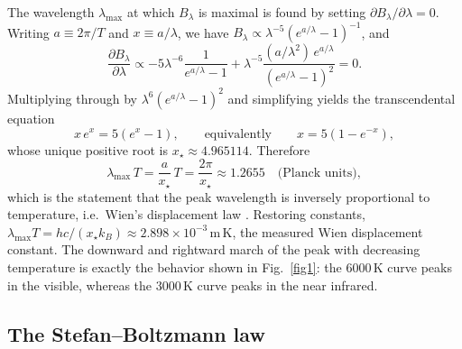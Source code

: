 \documentclass[10pt]{article}
\theoremstyle{definition}
\theoremstyle{remark}
\begin{document}
The wavelength $\lambda_{\max}$ at which $B_\lambda$ is maximal is found by setting $\partial B_\lambda/\partial\lambda = 0$. Writing $a \equiv 2\pi/T$ and $x \equiv a/\lambda$, we have $B_\lambda \propto \lambda^{-5}(e^{a/\lambda}-1)^{-1}$, and
\begin{equation}
\frac{\partial B_\lambda}{\partial\lambda} \propto -5\lambda^{-6}\frac{1}{e^{a/\lambda}-1} + \lambda^{-5}\frac{(a/\lambda^2)\,e^{a/\lambda}}{(e^{a/\lambda}-1)^2} = 0.
\end{equation}
Multiplying through by $\lambda^6(e^{a/\lambda}-1)^2$ and simplifying yields the transcendental equation
\begin{equation}\label{eq:wien-transc}
x\,e^x = 5\!\left(e^x - 1\right), \qquad\text{equivalently}\qquad x = 5\!\left(1 - e^{-x}\right),
\end{equation}
whose unique positive root is $x_\star \approx 4.965114$. Therefore
\begin{equation}
\lambda_{\max}\,T = \frac{a}{x_\star}\,T = \frac{2\pi}{x_\star} \approx 1.2655 \quad\text{(Planck units)},
\end{equation}
which is the statement that the peak wavelength is inversely proportional to temperature, i.e.\ Wien's displacement law \cite{wien1893}. Restoring constants, $\lambda_{\max} T = hc/(x_\star k_B) \approx 2.898\times 10^{-3}\,\mathrm{m\,K}$, the measured Wien displacement constant. The downward and rightward march of the peak with decreasing temperature is exactly the behavior shown in Fig.~\ref{fig1}: the $6000\,\mathrm{K}$ curve peaks in the visible, whereas the $3000\,\mathrm{K}$ curve peaks in the near infrared.

\subsection{The Stefan--Boltzmann law}
\end{document}
